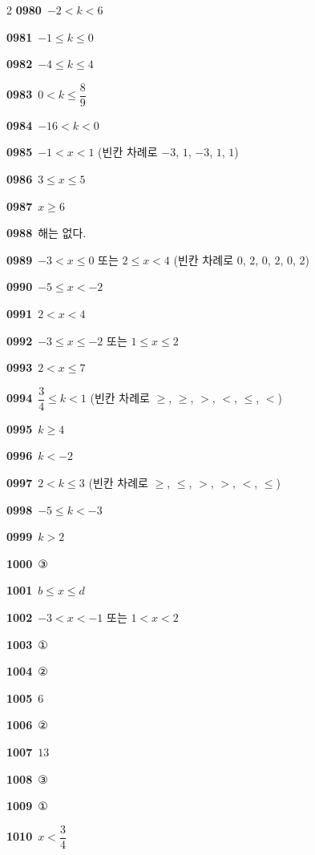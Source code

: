 \documentclass[10pt,a4paper]{article}
\begin{document}
\begin{multicols}{2}
\noindent\textbf{0980}\ $-2<k<6$\par
\noindent\textbf{0981}\ $-1\le k\le 0$\par
\noindent\textbf{0982}\ $-4\le k\le 4$\par
\noindent\textbf{0983}\ $0<k\le \dfrac{8}{9}$\par
\noindent\textbf{0984}\ $-16<k<0$\par
\noindent\textbf{0985}\ $-1<x<1$ (빈칸 차례로 $-3$, $1$, $-3$, $1$, $1$)\par
\noindent\textbf{0986}\ $3\le x\le 5$\par
\noindent\textbf{0987}\ $x\ge 6$\par
\noindent\textbf{0988}\ 해는 없다.\par
\noindent\textbf{0989}\ $-3<x\le 0$ 또는 $2\le x<4$ (빈칸 차례로 $0$, $2$, $0$, $2$, $0$, $2$)\par
\noindent\textbf{0990}\ $-5\le x<-2$\par
\noindent\textbf{0991}\ $2<x<4$\par
\noindent\textbf{0992}\ $-3\le x\le -2$ 또는 $1\le x\le 2$\par
\noindent\textbf{0993}\ $2<x\le 7$\par
\noindent\textbf{0994}\ $\dfrac{3}{4}\le k<1$ (빈칸 차례로 $\ge$, $\ge$, $>$, $<$, $\le$, $<$)\par
\noindent\textbf{0995}\ $k\ge 4$\par
\noindent\textbf{0996}\ $k<-2$\par
\noindent\textbf{0997}\ $2<k\le 3$ (빈칸 차례로 $\ge$, $\le$, $>$, $>$, $<$, $\le$)\par
\noindent\textbf{0998}\ $-5\le k<-3$\par
\noindent\textbf{0999}\ $k>2$\par
\noindent\textbf{1000}\ ③\par
\noindent\textbf{1001}\ $b\le x\le d$\par
\noindent\textbf{1002}\ $-3<x<-1$ 또는 $1<x<2$\par
\noindent\textbf{1003}\ ①\par
\noindent\textbf{1004}\ ②\par
\noindent\textbf{1005}\ $6$\par
\noindent\textbf{1006}\ ②\par
\noindent\textbf{1007}\ $13$\par
\noindent\textbf{1008}\ ③\par
\noindent\textbf{1009}\ ①\par
\noindent\textbf{1010}\ $x<\dfrac{3}{4}$\par

\end{multicols}
\end{document}

